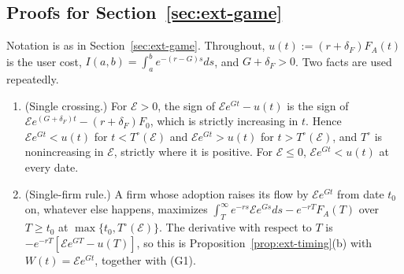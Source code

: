 \subsection{Proofs for Section~\ref{sec:ext-game}}\label{app:proofs-game}

Notation is as in Section~\ref{sec:ext-game}. Throughout, $u(t):=(r+\delta_F)F_A(t)$ is the user cost, $I(a,b)=\int_a^be^{-(r-G)s}ds$, and $G+\delta_F>0$. Two facts are used repeatedly.

\begin{enumerate}
\item[(G1)] (Single crossing.) For $\mathcal E>0$, the sign of $\mathcal Ee^{Gt}-u(t)$ is the sign of $\mathcal Ee^{(G+\delta_F)t}-(r+\delta_F)F_0$, which is strictly increasing in $t$. Hence $\mathcal Ee^{Gt}<u(t)$ for $t<T^\circ(\mathcal E)$ and $\mathcal Ee^{Gt}>u(t)$ for $t>T^\circ(\mathcal E)$, and $T^\circ$ is nonincreasing in $\mathcal E$, strictly where it is positive. For $\mathcal E\le0$, $\mathcal Ee^{Gt}<u(t)$ at every date.
\item[(G2)] (Single-firm rule.) A firm whose adoption raises its flow by $\mathcal Ee^{Gt}$ from date $t_0$ on, whatever else happens, maximizes $\int_T^\infty e^{-rs}\mathcal Ee^{Gs}ds-e^{-rT}F_A(T)$ over $T\ge t_0$ at $\max\{t_0,T^\circ(\mathcal E)\}$. The derivative with respect to $T$ is $-e^{-rT}[\mathcal Ee^{GT}-u(T)]$, so this is Proposition~\ref{prop:ext-timing}(b) with $W(t)=\mathcal Ee^{Gt}$, together with (G1).
\end{enumerate}

